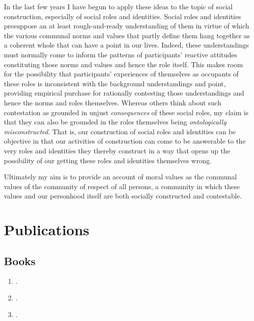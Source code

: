 \documentclass[%
  11pt,%
]{article}
\begin{document}
In the last few years I have begun to apply these ideas to the topic of social construction, especially of social roles and identities. Social roles and identities presuppose an at least rough-and-ready understanding of them in virtue of which the various communal norms and values that partly define them hang together as a coherent whole that can have a point in our lives. Indeed, these understandings must normally come to inform the patterns of participants' reactive attitudes constituting those norms and values and hence the role itself. This makes room for the possibility that participants' experiences of themselves as occupants of these roles is inconsistent with the background understandings and point, providing empirical purchase for rationally contesting those understandings and hence the norms and roles themselves. Whereas others think about such contestation as grounded in unjust \emph{consequences} of these social roles, my claim is that they can also be grounded in the roles themselves being \emph{ontologically misconstructed}. That is, our construction of social roles and identities can be objective in that our activities of construction can come to be answerable to the very roles and identities they thereby construct in a way that opens up the possibility of our getting these roles and identities themselves wrong.

\bigskip{}

Ultimately my aim is to provide an account of moral values as the communal values of the community of respect of all persons, a community in which these values and our personhood itself are both socially constructed and contestable.

\section{Publications}

\subsection{Books}

\begin{enumerate}

  \item {}. 
  \item {}. 
  \item {}. 

\end{enumerate}
\end{document}
